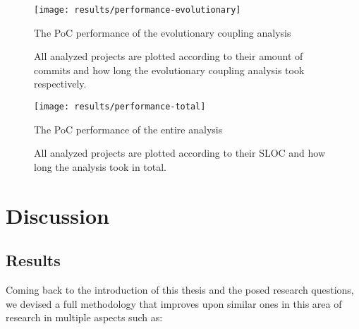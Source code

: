 \documentclass[12pt,a4paper]{report}
\begin{document}
\begin{figure}[htbp]
\centering
\texttt{[image: results/performance-evolutionary]}
\caption{The PoC performance of the evolutionary coupling analysis}
\caption*{\centering
  All analyzed projects are plotted according to their amount of commits
  and how long the evolutionary coupling analysis took respectively.
}
\label{fig:performance-evolutionary}
\end{figure}

\begin{figure}[htbp]
\centering
\texttt{[image: results/performance-total]}
\caption{The PoC performance of the entire analysis}
\caption*{\centering
  All analyzed projects are plotted according to their SLOC
  and how long the analysis took in total.
}
\label{fig:performance-total}
\end{figure}




\chapter{Discussion} \label{chap:discussion}

\section{Results}

Coming back to the introduction of this thesis and the posed research
questions, we devised a full methodology that improves upon similar ones in
this area of research in multiple aspects such as:
\end{document}
